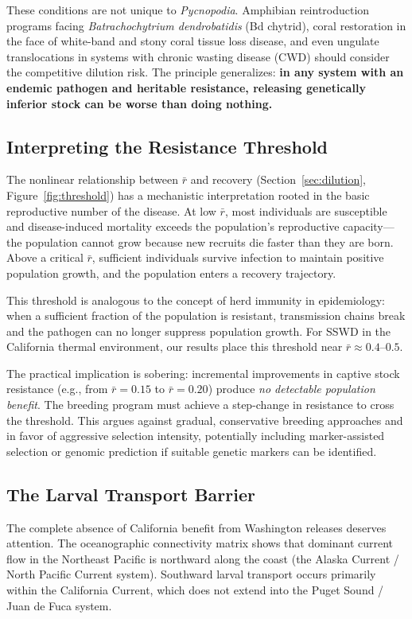 \documentclass[11pt,a4paper]{article}
\newcommand{\rbar}{\ensuremath{\bar{r}}}
\begin{document}
These conditions are not unique to \textit{Pycnopodia}. Amphibian reintroduction programs facing \textit{Batrachochytrium dendrobatidis} (Bd chytrid), coral restoration in the face of white-band and stony coral tissue loss disease, and even ungulate translocations in systems with chronic wasting disease (CWD) should consider the competitive dilution risk. The principle generalizes: \textbf{in any system with an endemic pathogen and heritable resistance, releasing genetically inferior stock can be worse than doing nothing.}

\subsection{Interpreting the Resistance Threshold}

The nonlinear relationship between $\rbar$ and recovery (Section~\ref{sec:dilution}, Figure~\ref{fig:threshold}) has a mechanistic interpretation rooted in the basic reproductive number of the disease. At low $\rbar$, most individuals are susceptible and disease-induced mortality exceeds the population's reproductive capacity---the population cannot grow because new recruits die faster than they are born. Above a critical $\rbar$, sufficient individuals survive infection to maintain positive population growth, and the population enters a recovery trajectory.

This threshold is analogous to the concept of herd immunity in epidemiology: when a sufficient fraction of the population is resistant, transmission chains break and the pathogen can no longer suppress population growth. For SSWD in the California thermal environment, our results place this threshold near $\rbar \approx 0.4$--$0.5$.

The practical implication is sobering: incremental improvements in captive stock resistance (e.g., from $\rbar = 0.15$ to $\rbar = 0.20$) produce \emph{no detectable population benefit}. The breeding program must achieve a step-change in resistance to cross the threshold. This argues against gradual, conservative breeding approaches and in favor of aggressive selection intensity, potentially including marker-assisted selection or genomic prediction if suitable genetic markers can be identified.

\subsection{The Larval Transport Barrier}

The complete absence of California benefit from Washington releases deserves attention. The oceanographic connectivity matrix shows that dominant current flow in the Northeast Pacific is northward along the coast (the Alaska Current / North Pacific Current system). Southward larval transport occurs primarily within the California Current, which does not extend into the Puget Sound / Juan de Fuca system.
\end{document}
